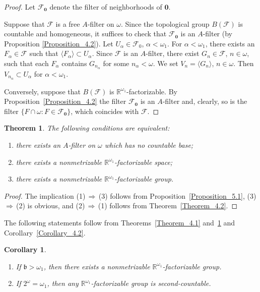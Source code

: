 \documentclass[a4paper,12pt]{amsart}
\newtheorem{theorem}{Theorem}[section]
\newtheorem{corollary}{Corollary}[section]
\theoremstyle{definition}
\theoremstyle{remark}
\begin{document}
\begin{proof}
Let $\mathscr F_{\mathbf 0}$ denote the filter of neighborhoods of $\mathbf 0$.

Suppose that $\mathscr F$ is a free $A$-filter on $\omega$.
Since the topological group $B(\mathscr F)$ is countable and homogeneous,  
it suffices to check that $\mathscr F_{\mathbf 0}$ is an $A$-filter (by Proposition \ref{Proposition_4.2}).
Let $U_\alpha\in \mathscr F_0$, $\alpha<\omega_1$. 
For $\alpha<\omega_1$, there exists an $F_\alpha\in \mathscr F$ such that 
$\langle F_\alpha\rangle\subset U_\alpha$. Since $\mathscr F$ is an $A$-filter, 
there exist $G_n\in \mathscr F$, $n\in\omega$, such that each $F_\alpha$ contains $G_{n_\alpha}$ 
for some $n_\alpha<\omega$. We set $V_n=\langle G_n\rangle$, $n\in\omega$. 
Then $V_{n_\alpha}\subset U_\alpha$ for $\alpha<\omega_1$. 

Conversely, suppose that $B(\mathscr F)$ is $\mathbb R^{\omega_1}$-factorizable. 
By Proposition~\ref{Proposition_4.2} the 
filter $\mathscr F_{\mathbf 0}$  is an $A$-filter and, clearly, so is the filter $\{F\cap 
\omega: F\in \mathscr F_{\mathbf 0}\}$, which coincides with $\mathscr F$. 
\end{proof} 

\begin{theorem}
\label{Theorem_5.2}
The following conditions are equivalent:
\begin{enumerate}
\item[\rm(1)]
there exists an $A$-filter on $\omega$ which has no countable base;
\item[\rm(2)] 
there exists a nonmetrizable $\mathbb R^{\omega_1}$-factorizable space;
\item[\rm(3)] 
there exists a nonmetrizable $\mathbb R^{\omega_1}$-factorizable group.
\end{enumerate}
\end{theorem}
\begin{proof}
The implication (1)\,$\Rightarrow$\,(3) follows from Proposition~\ref{Proposition_5.1}, 
(3)\,$\Rightarrow$\,(2) is obvious, and 
(2)\,$\Rightarrow$\,(1) follows from Theorem~\ref{Theorem_4.2}.
\end{proof}

The following statements follow from Theorems~\ref{Theorem_4.1} and~\ref{Theorem_5.2} 
and Corollary~\ref{Corollary_4.2}.

\begin{corollary}
\begin{enumerate}
\item[\rm(1)]
If $\mathfrak b>\omega_1$, then there exists a nonmetrizable $\mathbb R^{\omega_1}$-factorizable group. 
\item[\rm(2)] 
If $2^\omega=\omega_1$, then any $\mathbb R^{\omega_1}$-factorizable group is second-countable. 
\end{enumerate}
\end{corollary}
\end{document}
